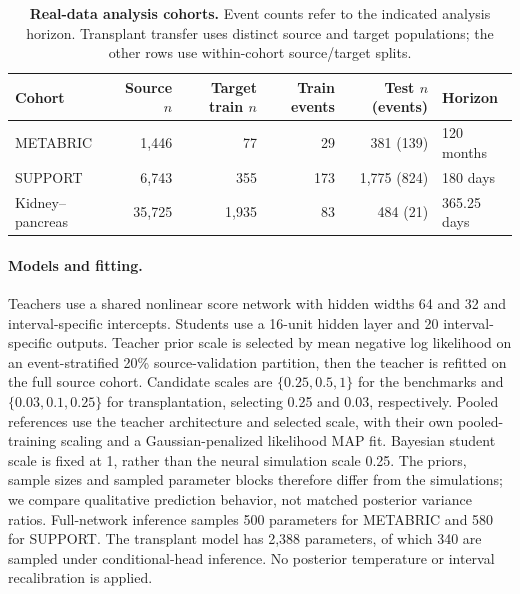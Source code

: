 \documentclass{article} %
\begin{document}
\begin{table}[htbp]
\centering\footnotesize
\caption{\textbf{Real-data analysis cohorts.} Event counts refer to the indicated analysis horizon. Transplant transfer uses distinct source and target populations; the other rows use within-cohort source/target splits.}
\label{tab:real-cohorts}
\setlength{\tabcolsep}{5pt}
\begin{tabular}{@{}lrrrrl@{}}
\toprule
Cohort & Source $n$ & Target train $n$ & Train events & Test $n$ (events) & Horizon\\
\midrule
METABRIC & 1,446 & 77 & 29 & 381 (139) & 120 months\\
SUPPORT & 6,743 & 355 & 173 & 1,775 (824) & 180 days\\
Kidney--pancreas & 35,725 & 1,935 & 83 & 484 (21) & 365.25 days\\
\bottomrule
\end{tabular}
\end{table}

\paragraph{Models and fitting.}
Teachers use a shared nonlinear score network with hidden widths 64 and 32 and interval-specific intercepts. Students use a 16-unit hidden layer and 20 interval-specific outputs. Teacher prior scale is selected by mean negative log likelihood on an event-stratified 20\% source-validation partition, then the teacher is refitted on the full source cohort. Candidate scales are $\{0.25,0.5,1\}$ for the benchmarks and $\{0.03,0.1,0.25\}$ for transplantation, selecting 0.25 and 0.03, respectively. Pooled references use the teacher architecture and selected scale, with their own pooled-training scaling and a Gaussian-penalized likelihood MAP fit. Bayesian student scale is fixed at 1, rather than the neural simulation scale 0.25. The priors, sample sizes and sampled parameter blocks therefore differ from the simulations; we compare qualitative prediction behavior, not matched posterior variance ratios. Full-network inference samples 500 parameters for METABRIC and 580 for SUPPORT. The transplant model has 2,388 parameters, of which 340 are sampled under conditional-head inference. No posterior temperature or interval recalibration is applied.
\end{document}
